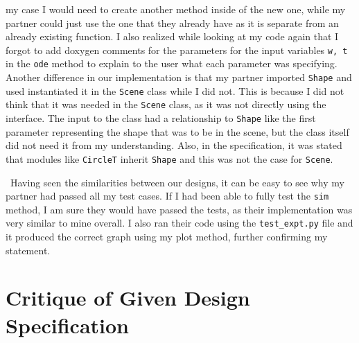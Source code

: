 \documentclass[12pt]{article}
\begin{document}
my case I would need to create another method inside of the new one, while my partner could just
use the one that they already have as it is separate from an already existing function. I also 
realized while looking at my code again that I forgot to add doxygen comments for the parameters 
for the input variables \verb|w, t| in the \verb|ode| method to explain to the user what each 
parameter was specifying. Another difference in our implementation is that my partner imported 
\verb|Shape| and used instantiated it in the \verb|Scene| class while I did not. This is because 
I did not think that it was needed in the \verb|Scene| class, as it was not directly using the 
interface. The input to the class had a relationship to \verb|Shape| like the first parameter 
representing the shape that was to be in the scene, but the class itself did not need it from my 
understanding. Also, in the specification, it was stated that modules like \verb|CircleT| inherit 
\verb|Shape| and this was not the case for \verb|Scene|. 

~\newline\noindent Having seen the similarities between our designs, it can be easy to see why my 
partner had passed all my test cases. If I had been able to fully test the \verb|sim| method, I 
am sure they would have passed the tests, as their implementation was very similar to mine 
overall. I also ran their code using the \verb|test_expt.py| file and it produced the correct 
graph using my plot method, further confirming my statement. 

\section{Critique of Given Design Specification}
\end{document}
